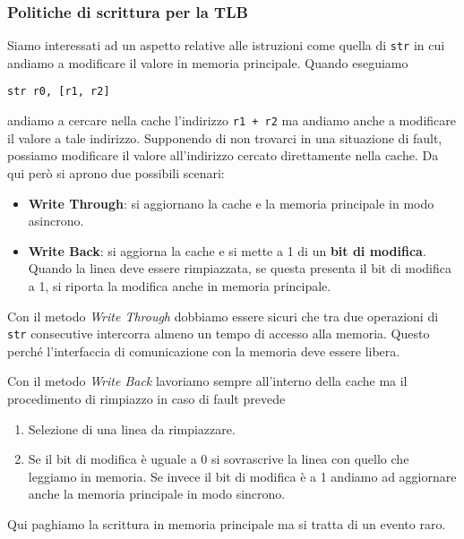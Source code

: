 \subsubsection{Politiche di scrittura per la TLB}
Siamo interessati ad un aspetto relative alle istruzioni come quella di \verb|str| in cui andiamo
a modificare il valore in memoria principale. Quando eseguiamo
\begin{verbatim}
str r0, [r1, r2]
\end{verbatim}
andiamo a cercare nella cache l'indirizzo \verb|r1 + r2| ma andiamo anche a modificare il valore a
tale indirizzo. Supponendo di non trovarci in una situazione di fault, possiamo modificare il
valore all'indirizzo cercato direttamente nella cache. Da qui però si aprono due possibili scenari:
\begin{itemize}
	\item \textbf{Write Through}: si aggiornano la cache e la memoria principale in modo asincrono.
	\item \textbf{Write Back}: si aggiorna la cache e si mette a 1 di un \textbf{bit di modifica}.
	      Quando la linea deve essere rimpiazzata, se questa presenta il bit di modifica a 1, si
	      riporta la modifica anche in memoria principale.
\end{itemize}
Con il metodo \emph{Write Through} dobbiamo essere sicuri che tra due operazioni di \verb|str|
consecutive intercorra almeno un tempo di accesso alla memoria. Questo perché l'interfaccia di
comunicazione con la memoria deve essere libera.

Con il metodo \emph{Write Back} lavoriamo sempre all'interno della cache ma il procedimento di
rimpiazzo in caso di fault prevede
\begin{enumerate}
	\item Selezione di una linea da rimpiazzare.
	\item Se il bit di modifica è uguale a 0 si sovrascrive la linea con quello che leggiamo in
	      memoria. Se invece il bit di modifica è a 1 andiamo ad aggiornare anche la memoria
	      principale in modo sincrono.
\end{enumerate}
Qui paghiamo la scrittura in memoria principale ma si tratta di un evento raro.

